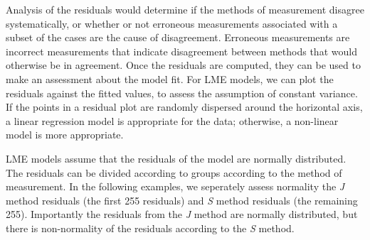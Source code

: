 \documentclass[12pt, a4paper]{report}
\theoremstyle{plain}
\theoremstyle{definition}
\theoremstyle{remark}
\begin{document}
	
	
	
	
			

	
	

	Analysis of the residuals would determine if the methods of measurement disagree systematically, or whether or not erroneous measurements associated with a subset of the cases are the cause of disagreement.
	Erroneous measurements are incorrect measurements that indicate disagreement between methods that would otherwise be in agreement.
	Once the residuals are computed, they can be used to make an assessment about the model fit. For LME models, we can plot the residuals against the fitted values, to assess the assumption of constant variance. If the points in a residual plot are randomly dispersed around the horizontal axis, a linear regression model is appropriate for the data; otherwise, a non-linear model is more appropriate.
	
	
	LME models assume that the residuals of the model are normally distributed.  The residuals can be divided according to groups according to the method of measurement. In the following examples, we seperately assess normality the \textit{J} method residuals (the first 255 residuals) and \textit{S} method residuals (the remaining 255). Importantly the residuals from the \textit{J} method are normally distributed, but there is non-normality of the residuals according to the \textit{S} method.
	
\end{document}
